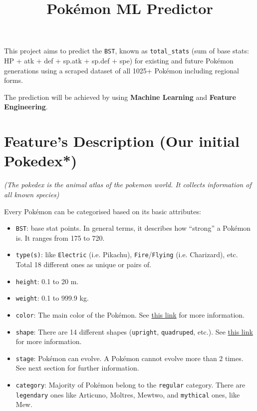 \documentclass[11pt]{article}
\title{Pokémon ML Predictor}
\author{}
\date{}
\begin{document}
\maketitle

This project aims to predict the \texttt{BST}, known as \texttt{total\_stats} (sum of base stats: HP + atk + def + sp.atk + sp.def + spe) for existing and future Pokémon generations using a scraped dataset of all 1025+ Pokémon including regional forms.

The prediction will be achieved by using \textbf{Machine Learning} and \textbf{Feature Engineering}.

\tableofcontents
\newpage

\section{Feature's Description (Our initial Pokedex*)}

\textit{(The pokedex is the animal atlas of the pokemon world. It collects information of all known species)}

Every Pokémon can be categorised based on its basic attributes:

\begin{itemize}
    \item \texttt{BST}: base stat points. In general terms, it describes how ``strong'' a Pokémon is. It ranges from 175 to 720.
    \item \texttt{type(s)}: like \texttt{Electric} (i.e. Pikachu), \texttt{Fire}/\texttt{Flying} (i.e. Charizard), etc. Total 18 different ones as unique or pairs of.
    \item \texttt{height}: 0.1 to 20 m.
    \item \texttt{weight}: 0.1 to 999.9 kg.
    \item \texttt{color}: The main color of the Pokémon. See \href{https://bulbapedia.bulbagarden.net/wiki/List_of_Pok%C3%A9mon_by_shape}{this link} for more information.
    \item \texttt{shape}: There are 14 different shapes (\texttt{upright}, \texttt{quadruped}, etc.). See \href{https://bulbapedia.bulbagarden.net/wiki/List_of_Pok%C3%A9mon_by_color}{this link} for more information.
    \item \texttt{stage}: Pokémon can evolve. A Pokémon cannot evolve more than 2 times. See next section for further information.
    \item \texttt{category}: Majority of Pokémon belong to the \texttt{regular} category. There are \texttt{legendary} ones like Articuno, Moltres, Mewtwo, and \texttt{mythical} ones, like Mew.
\end{itemize}
\end{document}
